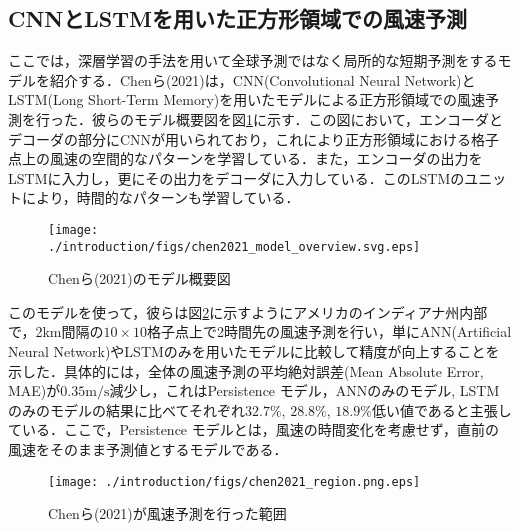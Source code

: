 \subsection{CNNとLSTMを用いた正方形領域での風速予測 \label{subsec:chen2021}}
ここでは，深層学習の手法を用いて全球予測ではなく局所的な短期予測をするモデルを紹介する．Chenら(2021)は，CNN(Convolutional Neural Network)\cite{Yamashita2018}とLSTM(Long Short-Term Memory)\cite{10.1162/neco.1997.9.8.1735}を用いたモデルによる正方形領域での風速予測を行った\cite{CHEN2021114451}．彼らのモデル概要図を図\ref{fig:chen2021_architecture}に示す．この図において，エンコーダとデコーダの部分にCNNが用いられており，これにより正方形領域における格子点上の風速の空間的なパターンを学習している．また，エンコーダの出力をLSTMに入力し，更にその出力をデコーダに入力している．このLSTMのユニットにより，時間的なパターンも学習している．
\begin{figure}[bp]
    \centering
    \texttt{[image: ./introduction/figs/chen2021\_model\_overview.svg.eps]}
    \caption{Chenら(2021)のモデル概要図\cite{CHEN2021114451}}
    \label{fig:chen2021_architecture}
\end{figure}

このモデルを使って，彼らは図\ref{fig:chen2021_region}に示すようにアメリカのインディアナ州内部で，2km間隔の$10 \times 10$格子点上で2時間先の風速予測を行い，単にANN(Artificial Neural Network)\cite{485891}やLSTMのみを用いたモデルに比較して精度が向上することを示した．具体的には，全体の風速予測の平均絶対誤差(Mean Absolute Error, MAE)が$0.35 \mathrm{m/s}$減少し，これはPersistence モデル，ANNのみのモデル, LSTMのみのモデルの結果に比べてそれぞれ$32.7\%$, $28.8\%$, $18.9\%$低い値であると主張している．ここで，Persistence モデルとは，風速の時間変化を考慮せず，直前の風速をそのまま予測値とするモデルである．
\begin{figure}[bp]
    \centering
    \texttt{[image: ./introduction/figs/chen2021\_region.png.eps]}
    \caption{Chenら(2021)が風速予測を行った範囲\cite{CHEN2021114451}}
    \label{fig:chen2021_region}
\end{figure}

